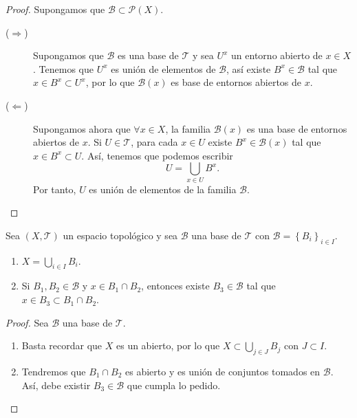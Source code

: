 \begin{proof}
Supongamos que $\displaystyle \mathcal{B}\subset \mathcal{P}\left(X\right) $.
\begin{description}
	\item[($\displaystyle \Rightarrow $)] Supongamos que $\displaystyle \mathcal{B} $ es una base de $\displaystyle \mathcal{T} $ y sea $\displaystyle U^{x} $ un entorno abierto de $\displaystyle x \in X $. Tenemos que $\displaystyle U^{x}$ es unión de elementos de $\displaystyle \mathcal{B} $, así existe $\displaystyle B^{x} \in \mathcal{B} $ tal que $\displaystyle x \in B^{x} \subset U^{x} $, por lo que $\displaystyle \mathcal{B}\left(x\right) $ es base de entornos abiertos de $\displaystyle x $. 
	\item[($\displaystyle \Leftarrow $)] Supongamos ahora que $\displaystyle \forall x \in X $, la familia $\displaystyle \mathcal{B}\left(x\right) $ es una base de entornos abiertos de $\displaystyle x $. Si $\displaystyle U \in \mathcal{T} $, para cada $\displaystyle x \in U $ existe $\displaystyle B^{x} \in \mathcal{B}\left(x\right) $ tal que $\displaystyle x \in B^{x}\subset U $. Así, tenemos que podemos escribir
		\[U = \bigcup_{x \in U}B^{x} .\]
		Por tanto, $\displaystyle U $ es unión de elementos de la familia $\displaystyle \mathcal{B} $. 
\end{description}
\end{proof}

\begin{prop}
	Sea $\displaystyle \left(X, \mathcal{T}\right) $ un espacio topológico y sea $\displaystyle \mathcal{B} $ una base de $\displaystyle \mathcal{T} $ con $\displaystyle \mathcal{B}= \left\{ B_{i}\right\} _{i \in I} $. 
	\begin{enumerate}
	\item $\displaystyle X = \bigcup_{i \in I}B_{i} $.
	\item Si $\displaystyle B_{1}, B_{2}\in\mathcal{B} $ y $\displaystyle x \in B_{1} \cap B_{2} $, entonces existe $\displaystyle B_{3}\in \mathcal{B} $ tal que $\displaystyle x \in B_{3}\subset B_{1} \cap B_{2} $. 
	\end{enumerate}
\end{prop}
\begin{proof}
Sea $\displaystyle \mathcal{B} $ una base de $\displaystyle \mathcal{T} $. 
\begin{enumerate}
\item Basta recordar que $\displaystyle X $ es un abierto, por lo que $\displaystyle X \subset \bigcup_{j \in J }B_{j} $ con $\displaystyle J \subset I $. 
\item Tendremos que $\displaystyle B_{1} \cap B_{2} $ es abierto y es unión de conjuntos tomados en $\displaystyle \mathcal{B} $. Así, debe existir $\displaystyle B_{3} \in \mathcal{B} $ que cumpla lo pedido.
\end{enumerate}
\end{proof}

